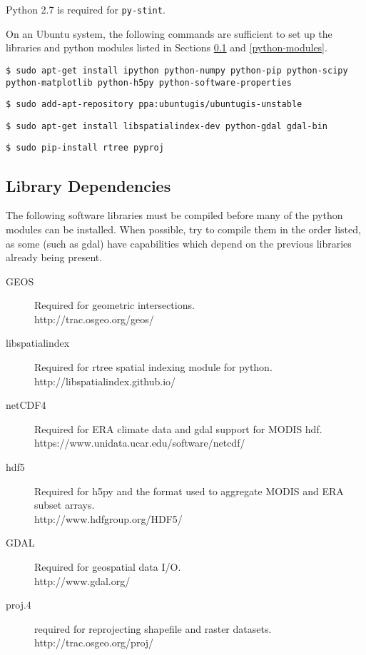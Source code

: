 \documentclass[twoside,a4paper]{refart}
\begin{document}
Python 2.7 is required for \texttt{py-stint}.

On an Ubuntu system, the following commands are sufficient to set up the libraries and python modules listed in Sections \ref{libraries} and \ref{python-modules}.

\texttt{\$ sudo apt-get install ipython python-numpy python-pip python-scipy python-matplotlib python-h5py python-software-properties}

\texttt{\$ sudo add-apt-repository ppa:ubuntugis/ubuntugis-unstable}

\texttt{\$ sudo apt-get install libspatialindex-dev python-gdal gdal-bin}

\texttt{\$ sudo pip-install rtree pyproj}


\subsection{Library Dependencies}\label{libraries}
The following software libraries must be compiled before many 
of the python modules can be installed.  
When possible, try to compile them in the order listed, as some 
(such as gdal) have capabilities which depend on the previous 
libraries already being present.
\begin{description}

\item[GEOS]
        Required for geometric intersections.\\
        http://trac.osgeo.org/geos/

\item[libspatialindex]
        Required for rtree spatial indexing module for python.\\
        http://libspatialindex.github.io/

\item[netCDF4]
        Required for ERA climate data and gdal support for MODIS hdf.\\
        https://www.unidata.ucar.edu/software/netcdf/
        
\item[hdf5]
       Required for h5py and the format used 
       to aggregate MODIS and ERA subset arrays.\\
       http://www.hdfgroup.org/HDF5/
       
\item[GDAL]
        Required for geospatial data I/O.\\
        http://www.gdal.org/

\item[proj.4]
       required for reprojecting shapefile and raster datasets.\\
       http://trac.osgeo.org/proj/

\end{description}
\end{document}
